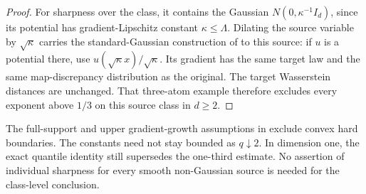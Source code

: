 \documentclass[11pt]{article}
\numberwithin{equation}{section}
\theoremstyle{remark}
\begin{document}
\begin{proof}
For sharpness over the class, it contains the Gaussian $N(0,\kappa^{-1}I_d)$, since its potential has gradient-Lipschitz constant $\kappa\le\Lambda$. Dilating the source variable by $\sqrt\kappa$ carries the standard-Gaussian construction of  to this source: if $u$ is a potential there, use $u(\sqrt\kappa x)/\sqrt\kappa$. Its gradient has the same target law and the same map-discrepancy distribution as the original. The target Wasserstein distances are unchanged. That three-atom example therefore excludes every exponent above $1/3$ on this source class in $d\ge2$.
\end{proof}

The full-support and upper gradient-growth assumptions in  exclude convex hard boundaries. The constants need not stay bounded as $q\downarrow2$. In dimension one, the exact quantile identity still supersedes the one-third estimate. No assertion of individual sharpness for every smooth non-Gaussian source is needed for the class-level conclusion.
\end{document}
